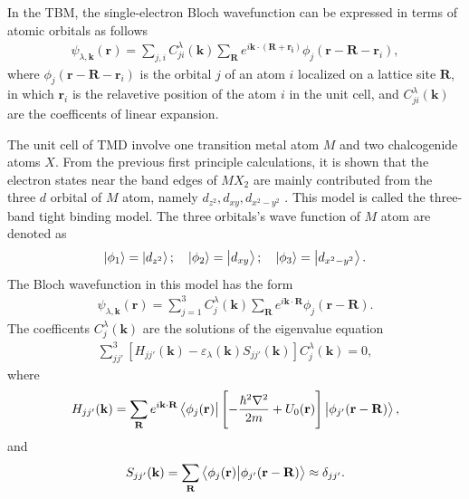 \documentclass{report}
\newcommand{\f}[2]{\dfrac{#1}{#2}}
\begin{document}
In the \acf{TBM}, the single-electron Bloch wavefunction can be expressed in terms of atomic orbitals as follows
\begin{gather}
	\psi_{\lambda,\mathbf{k}}(\mathbf{r}) = \sum_{j,i} C_{ji}^{\lambda}(\mathbf{k}) \sum_{\mathbf{R}} e^{i\mathbf{k}\cdot(\mathbf{R+\mathbf{r}_{i}})} \phi_{j}(\mathbf{r} - \mathbf{R} - \mathbf{r}_{i}),
\end{gather}
where $\phi_{j}(\mathbf{r} - \mathbf{R} - \mathbf{r}_{i})$ is the orbital $j$ of an atom $i$ localized on a lattice site $\mathbf{R}$, in which $\mathbf{r}_{i}$ is the relavetive position of the atom $i$ in the unit cell, and $C_{ji}^{\lambda}(\mathbf{k})$ are the coefficents of linear expansion.

The unit cell of \ac{TMD} involve one transition metal atom $M$ and two chalcogenide atoms $X$. From the previous first principle calculations, it is shown that the electron states near the band edges of $MX_{2}$ are mainly contributed from the three $d$ orbital of $M$ atom, namely $d_{z^{2}},d_{xy},d_{x^{2}-y^{2}}$ \cite{PhysRevB.88.085433}. This model is called the three-band tight binding model. The three orbitals's wave function of $M$ atom are denoted as
\begin{gather}
	\ket{\phi_{1}} = \ket{d_{z^{2}}} ; \quad \ket{\phi_{2}} = \ket{d_{xy}} ; \quad \ket{\phi_{3}} = \ket{d_{x^{2} - y^{2}}}.
\end{gather}
The Bloch wavefunction in this model has the form
\begin{gather}
	\psi_{\lambda,\mathbf{k}}(\mathbf{r}) = \sum_{j=1}^{3} C_{j}^{\lambda}(\mathbf{k}) \sum_{\mathbf{R}} e^{i \mathbf{k \cdot R}} \phi_{j}(\mathbf{r} - \mathbf{R}).
\end{gather}
The coefficents $C_{j}^{\lambda}(\mathbf{k})$ are the solutions of the eigenvalue equation
\begin{gather}
	\sum_{jj'}^{3} \left[H_{jj'}(\mathbf{k}) - \varepsilon_{\lambda}(\mathbf{k}) S_{jj'}(\mathbf{k})\right] C_{j}^{\lambda}(\mathbf{k}) = 0,
\end{gather}
where
\begin{gather}
	H_{jj'}(\mathbf{k}) = \sum_{\mathbf{R}} e^{i \mathbf{k \cdot R}} \bra{\phi_{j}(\mathbf{r})} \left[-\f{\hbar^{2} \nabla^{2}}{2m} + U_{0}(\mathbf{r})\right] \ket{\phi_{j'}(\mathbf{r - R})},
\end{gather}
and
\begin{gather}
	S_{jj'}(\mathbf{k}) = \sum_{\mathbf{R}} \bra{\phi_{j}(\mathbf{r})} \ket{\phi_{j'}(\mathbf{r - R})} \approx \delta_{jj'}.
\end{gather}
\end{document}
